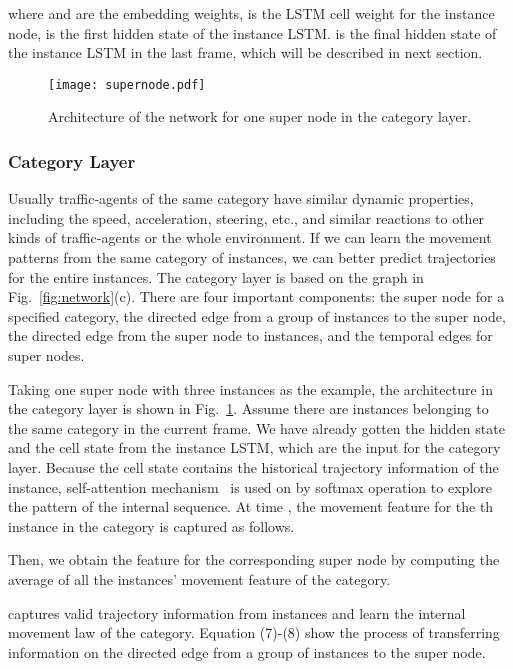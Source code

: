 \documentclass[letterpaper]{article} \usepackage{aaai19}  \usepackage{times}  \usepackage{helvet}  \usepackage{courier}  \usepackage{url}  \usepackage{graphicx}  \usepackage{amsmath}
\begin{document}
where  and  are the embedding weights,  is the LSTM cell weight for the instance node,  is the first hidden state of the instance LSTM.  is the final hidden state of the instance LSTM in the last frame, which will be described in next section. 


\begin{figure}
\texttt{[image: supernode.pdf]}
\caption{Architecture of the network for one super node in the category layer.}
\label{fig:supernode}
\vspace{-2ex}
\end{figure}


\subsubsection{Category Layer}

Usually traffic-agents of the same category have similar dynamic properties, including the speed, acceleration, steering, etc., and similar reactions to other kinds of traffic-agents or the whole environment. If we can learn the movement patterns from the same category of instances, we can better predict trajectories for the entire instances. The category layer is based on the graph in Fig.~\ref{fig:network}(c). There are four important components: the super node for a specified category, the directed edge from a group of instances to the super node, the directed edge from the super node to instances, and the temporal edges for super nodes. 

Taking one super node with three instances as the example, the architecture in the category layer is shown in Fig.~\ref{fig:supernode}. Assume there are  instances belonging to the same category in the current frame. We have already gotten the hidden state  and the cell state  from the instance LSTM, which are the input for the category layer. Because the cell state  contains the historical trajectory information of the instance, self-attention mechanism~\cite{vaswani2017attention} is used on  by softmax operation to explore the pattern of the internal sequence. At time , the movement feature  for the th instance in the category is captured as follows.

 
 
 Then, we obtain the feature  for the corresponding super node  by computing the average of all the instances' movement feature of the category. 
 
  
  
   captures valid trajectory information from instances and learn the internal movement law of the category. Equation (7)-(8) show the process of transferring information on the directed edge from a group of instances to the super node.
  
\end{document}
